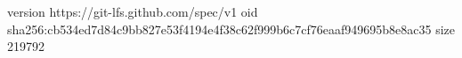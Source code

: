 version https://git-lfs.github.com/spec/v1
oid sha256:cb534ed7d84c9bb827e53f4194e4f38c62f999b6c7cf76eaaf949695b8e8ac35
size 219792
